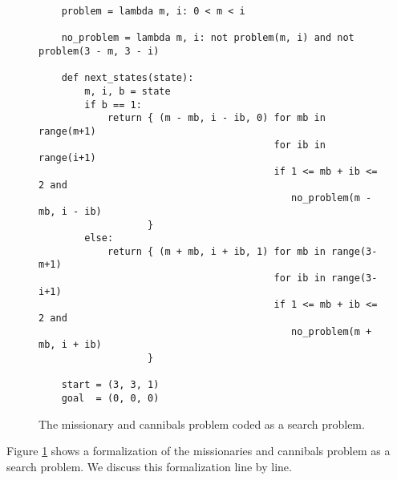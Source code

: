 \begin{figure}[!ht]
\centering
\begin{verbatim}
    problem = lambda m, i: 0 < m < i

    no_problem = lambda m, i: not problem(m, i) and not problem(3 - m, 3 - i)

    def next_states(state):
        m, i, b = state
        if b == 1:
            return { (m - mb, i - ib, 0) for mb in range(m+1)
                                         for ib in range(i+1)
                                         if 1 <= mb + ib <= 2 and 
                                            no_problem(m - mb, i - ib) 
                   }
        else:
            return { (m + mb, i + ib, 1) for mb in range(3-m+1)
                                         for ib in range(3-i+1)
                                         if 1 <= mb + ib <= 2 and 
                                            no_problem(m + mb, i + ib) 
                   }

    start = (3, 3, 1)
    goal  = (0, 0, 0)
\end{verbatim}
\vspace*{-0.3cm}
\caption{The missionary and cannibals problem coded as a search problem.}
\label{fig:missionaries.stlx}
\end{figure}
\noindent
Figure \ref{fig:missionaries.stlx} shows a formalization of the missionaries and cannibals problem
as a search problem.  We discuss this formalization line by line.
